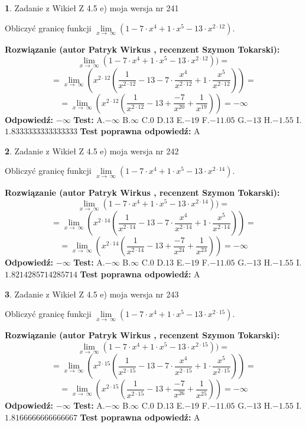 \documentclass[12pt, a4paper]{article}
\theoremstyle{definition} %
\newtheorem{zad}{}
\newcommand{\zadStart}[1]{\begin{zad}#1\newline}
\newcommand{\zadStop}{\end{zad}}
\newcommand{\rozwStart}[2]{\noindent \textbf{Rozwiązanie (autor #1 , recenzent #2): }\newline}
\newcommand{\rozwStop}{\newline}
\newcommand{\odpStart}{\noindent \textbf{Odpowiedź:}\newline}
\newcommand{\odpStop}{\newline}
\newcommand{\testStart}{\noindent \textbf{Test:}\newline}
\newcommand{\testStop}{\newline}
\newcommand{\kluczStart}{\noindent \textbf{Test poprawna odpowiedź:}\newline}
\newcommand{\kluczStop}{\newline}
\begin{document}
\zadStart{Zadanie z Wikieł Z 4.5 e) moja wersja nr 241}


Obliczyć granicę funkcji  $\lim\limits_{x\to\ \infty}(1 - 7 \cdot x^{4}+1 \cdot x^{5}- 13 \cdot x^{2\cdot12})$.
\zadStop
\rozwStart{Patryk Wirkus}{Szymon Tokarski}
$$\lim\limits_{x\to\ \infty}(1 - 7 \cdot x^{4}+1 \cdot x^{5}- 13 \cdot x^{2\cdot12}))=$$
$$=\lim\limits_{x\to\ \infty}(x^{2\cdot12}(\frac{1}{x^{2\cdot12}}-13 -7 \cdot \frac{x^{4}}{x^{2\cdot12}}+1 \cdot \frac{x^{5}}{x^{2\cdot12}}))=$$
$$=\lim\limits_{x\to\ \infty}(x^{2\cdot12}(\frac{1}{x^{2\cdot12}}-13 + \frac{-7}{x^{20}}+ \frac{1}{x^{19}}))=-\infty$$
\rozwStop
\odpStart
$-\infty$
\odpStop
\testStart
A.$-\infty$ B.$\infty$ C.$0$ D.$13$ E.$-19$
F.$-11.05$ G.$-13$
H.$-1.55$
I.$1.8333333333333333$
\testStop
\kluczStart
A
\kluczStop



\zadStart{Zadanie z Wikieł Z 4.5 e) moja wersja nr 242}


Obliczyć granicę funkcji  $\lim\limits_{x\to\ \infty}(1 - 7 \cdot x^{4}+1 \cdot x^{5}- 13 \cdot x^{2\cdot14})$.
\zadStop
\rozwStart{Patryk Wirkus}{Szymon Tokarski}
$$\lim\limits_{x\to\ \infty}(1 - 7 \cdot x^{4}+1 \cdot x^{5}- 13 \cdot x^{2\cdot14}))=$$
$$=\lim\limits_{x\to\ \infty}(x^{2\cdot14}(\frac{1}{x^{2\cdot14}}-13 -7 \cdot \frac{x^{4}}{x^{2\cdot14}}+1 \cdot \frac{x^{5}}{x^{2\cdot14}}))=$$
$$=\lim\limits_{x\to\ \infty}(x^{2\cdot14}(\frac{1}{x^{2\cdot14}}-13 + \frac{-7}{x^{24}}+ \frac{1}{x^{23}}))=-\infty$$
\rozwStop
\odpStart
$-\infty$
\odpStop
\testStart
A.$-\infty$ B.$\infty$ C.$0$ D.$13$ E.$-19$
F.$-11.05$ G.$-13$
H.$-1.55$
I.$1.8214285714285714$
\testStop
\kluczStart
A
\kluczStop



\zadStart{Zadanie z Wikieł Z 4.5 e) moja wersja nr 243}


Obliczyć granicę funkcji  $\lim\limits_{x\to\ \infty}(1 - 7 \cdot x^{4}+1 \cdot x^{5}- 13 \cdot x^{2\cdot15})$.
\zadStop
\rozwStart{Patryk Wirkus}{Szymon Tokarski}
$$\lim\limits_{x\to\ \infty}(1 - 7 \cdot x^{4}+1 \cdot x^{5}- 13 \cdot x^{2\cdot15}))=$$
$$=\lim\limits_{x\to\ \infty}(x^{2\cdot15}(\frac{1}{x^{2\cdot15}}-13 -7 \cdot \frac{x^{4}}{x^{2\cdot15}}+1 \cdot \frac{x^{5}}{x^{2\cdot15}}))=$$
$$=\lim\limits_{x\to\ \infty}(x^{2\cdot15}(\frac{1}{x^{2\cdot15}}-13 + \frac{-7}{x^{26}}+ \frac{1}{x^{25}}))=-\infty$$
\rozwStop
\odpStart
$-\infty$
\odpStop
\testStart
A.$-\infty$ B.$\infty$ C.$0$ D.$13$ E.$-19$
F.$-11.05$ G.$-13$
H.$-1.55$
I.$1.8166666666666667$
\testStop
\kluczStart
A
\kluczStop
\end{document}
